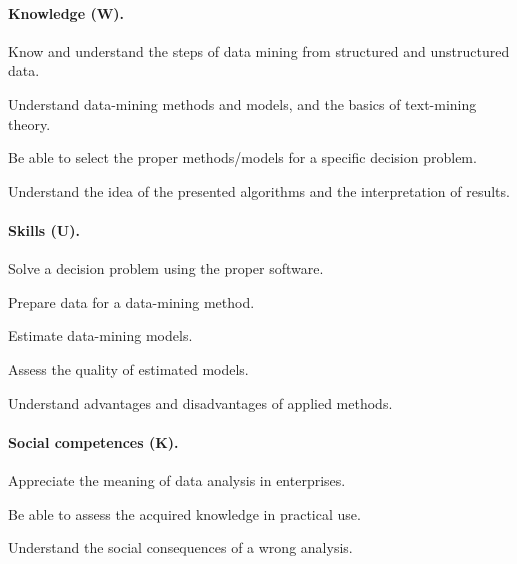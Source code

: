 \documentclass[11pt,a4paper]{article}
\begin{document}
\paragraph{Knowledge (W).}
\begin{description}[leftmargin=3.2em,style=nextline,itemsep=1pt]
  \item[W1] Know and understand the steps of data mining from structured and unstructured data.
  \item[W2] Understand data-mining methods and models, and the basics of text-mining theory.
  \item[W3] Be able to select the proper methods/models for a specific decision problem.
  \item[W4] Understand the idea of the presented algorithms and the interpretation of results.
\end{description}

\paragraph{Skills (U).}
\begin{description}[leftmargin=3.2em,style=nextline,itemsep=1pt]
  \item[U1] Solve a decision problem using the proper software.
  \item[U2] Prepare data for a data-mining method.
  \item[U3] Estimate data-mining models.
  \item[U4] Assess the quality of estimated models.
  \item[U5] Understand advantages and disadvantages of applied methods.
\end{description}

\paragraph{Social competences (K).}
\begin{description}[leftmargin=3.2em,style=nextline,itemsep=1pt]
  \item[K1] Appreciate the meaning of data analysis in enterprises.
  \item[K2] Be able to assess the acquired knowledge in practical use.
  \item[K3] Understand the social consequences of a wrong analysis.
\end{description}
\end{document}
